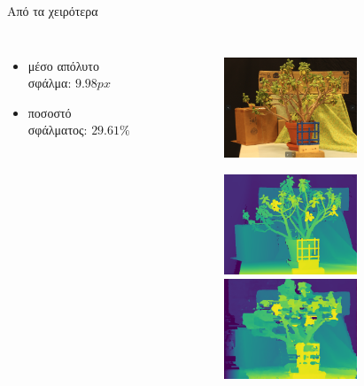 \documentclass[english,greek]{beamer}
\begin{document}
\begin{frame}{Από τα χειρότερα}
\begin{columns}[onlytextwidth]
\begin{itemize}
	\item μέσο απόλυτο σφάλμα: $9.98 px$
	\item ποσοστό σφάλματος: $29.61\%$
\end{itemize}
\begin{figure}
	\centering
	\begin{subfigure}{\textwidth}
	\centering
	\includegraphics[height=30mm]{mb_worst_imL.png}
	\end{subfigure}
	
	\begin{subfigure}{\textwidth}
	\centering
	\includegraphics[height=30mm]{mb_worst_disparity_gt.png}
	\includegraphics[height=30mm]{mb_worst_disparity_pred.png}
	\end{subfigure}
\end{figure}
\end{columns}
\end{frame}
\end{document}
